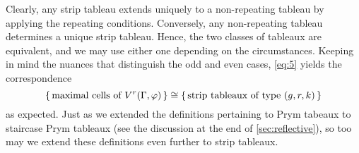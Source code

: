 \documentclass[11pt,reqno]{amsart}
\makeatletter
\newcommand*{\Z}{\mathbb{Z}}
\let\@@pmod\pmod
\DeclareRobustCommand{\pmod}{\@ifstar\@pmods\@@pmod}
\def\@pmods#1{\mkern4mu({\operator@font mod}\mkern 6mu#1)}
\newcommand{\yoav}[1]{{\color{blue} \sf  Yo$\alpha$v: [#1]}}
\theoremstyle{definition}
\theoremstyle{problem}
\theoremstyle{plain}
\newtheorem{lemma}[definition]{Lemma}
\newtheorem{corollary}[definition]{Corollary}
\theoremstyle{remark}
\theoremstyle{theorem}
\numberwithin{equation}{section}
\numberwithin{figure}{section}
\makeatother
\begin{document}
Clearly, any strip tableau extends uniquely to a non-repeating tableau
by applying the repeating conditions.  Conversely, any non-repeating
tableau determines a unique strip tableau.  Hence, the two classes of
tableaux are equivalent, and we may use either one depending on the
circumstances.  Keeping in mind the nuances that distinguish the odd
and even cases, \cref{eq:5} yields the correspondence
\begin{equation}
\label{eq:8}
\set{\text{maximal cells of
    $V^r(\Gamma,\varphi)$}} \cong \set{\text{strip tableaux of type $(g,r,k)$}}
\end{equation}
as expected.  Just as we extended the definitions pertaining to Prym
tabeaux to staircase Prym tableaux (see the discussion at the end of
\cref{sec:reflective}), so too may we extend these definitions even
further to strip tableaux.

%
%
%
%
%
\end{document}
